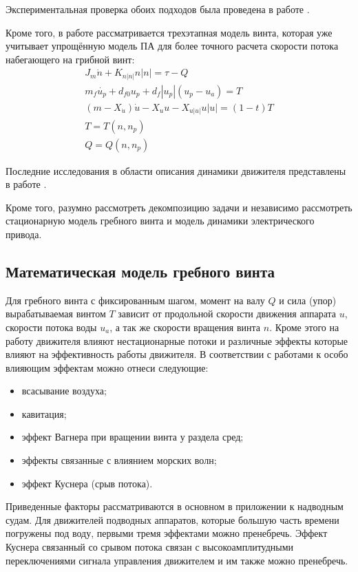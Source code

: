 Экспериментальная проверка обоих подходов была проведена в работе \cite{whitcomb1999development}.

Кроме того, в работе \cite{blanke2000dynamic} рассматривается трехэтапная модель винта, которая уже учитывает упрощённую модель ПА для более точного расчета скорости потока набегающего на грибной винт:
\begin{gather}
    J_m\dot{n} + K_{n|n|}n|n| = \tau - Q \\
    m_f \dot{u_p} + d_{f0}u_p + d_f|u_p|(u_p - u_a) = T \\
    (m - X_{\dot{u}})\dot{u} - X_u u - X_{u|u|}u|u| = (1-t)T\\
    T = T(n,n_p) \\
    Q = Q(n,n_p)
\end{gather}

Последние исследования в области описания динамики движителя представлены в работе \cite{10.1109/robot.2005.1570115}.

Кроме того, разумно рассмотреть декомпозицию задачи и независимо рассмотреть стационарную модель гребного винта и модель динамики электрического привода.

\subsection{Математическая модель гребного винта}

Для гребного винта с фиксированным шагом, момент на валу $Q$ и сила (упор) вырабатываемая винтом $T$ зависит от продольной скорости движения аппарата $u$, скорости потока воды $u_a$, а так же скорости вращения винта $n$.
Кроме этого на работу движителя влияют нестационарные потоки и различные эффекты которые влияют на эффективность работы движителя.
В соответствии с работами \cite{newman2018marine, breslin1996hydrodynamics, carlton2018marine} к особо влияющим эффектам можно отнеси следующие:
\begin{itemize}
    \item всасывание воздуха;
    \item кавитация;
    \item эффект Вагнера при вращении винта у раздела сред;
    \item эффекты связанные с влиянием морских волн;
    \item эффект Куснера (срыв потока).
\end{itemize}

Приведенные факторы рассматриваются в основном в приложении к надводным судам.
Для движителей подводных аппаратов, которые большую часть времени погружены под воду, первыми тремя эффектами можно пренебречь.
Эффект Куснера связанный со срывом потока связан с высокоамплитудными переключениями сигнала управления движителем и им также можно пренебречь.

